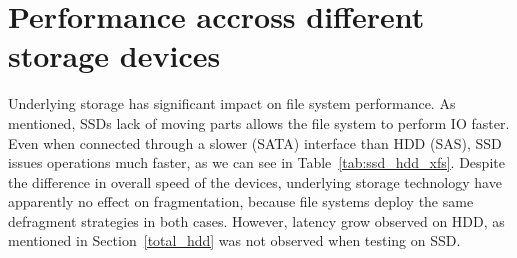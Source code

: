 \documentclass[
  color, %
  table, %
  lof,   %
  lot,   %
]{fithesis3}
\begin{document}


\section{Performance accross different storage devices}
Underlying storage has significant impact on file system performance. As mentioned, SSDs lack of moving parts allows the file system to perform IO faster. Even when connected through a slower (SATA) interface than HDD (SAS), SSD issues operations much faster, as we can see in Table~\ref{tab:ssd_hdd_xfs}. Despite the difference in overall speed of the devices, underlying storage technology have apparently no effect on fragmentation, because file systems deploy the same defragment strategies in both cases. However, latency grow observed on HDD, as mentioned in Section~\ref{total_hdd} was not observed when testing on SSD.
\end{document}
